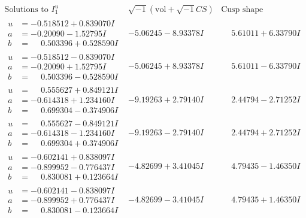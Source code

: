 \documentclass[1p]{elsarticle_modified}
\theoremstyle{definition}
\newcommand{\I}{\sqrt{-1}}
\begin{document}
$$\begin{array}{c|c|c}  
\text{Solutions to }I^u_{1}& \I (\text{vol} + \sqrt{-1}CS) & \text{Cusp shape}\\
 \hline 
\begin{aligned}
u &= -0.518512 + 0.839070 I \\
a &= -0.20090 - 1.52795 I \\
b &= \phantom{-}0.503396 + 0.528590 I\end{aligned}
 & -5.06245 - 8.93378 I & \phantom{-}5.61011 + 6.33790 I \\ \hline\begin{aligned}
u &= -0.518512 - 0.839070 I \\
a &= -0.20090 + 1.52795 I \\
b &= \phantom{-}0.503396 - 0.528590 I\end{aligned}
 & -5.06245 + 8.93378 I & \phantom{-}5.61011 - 6.33790 I \\ \hline\begin{aligned}
u &= \phantom{-}0.555627 + 0.849121 I \\
a &= -0.614318 + 1.234160 I \\
b &= \phantom{-}0.699304 - 0.374906 I\end{aligned}
 & -9.19263 + 2.79140 I & \phantom{-}2.44794 - 2.71252 I \\ \hline\begin{aligned}
u &= \phantom{-}0.555627 - 0.849121 I \\
a &= -0.614318 - 1.234160 I \\
b &= \phantom{-}0.699304 + 0.374906 I\end{aligned}
 & -9.19263 - 2.79140 I & \phantom{-}2.44794 + 2.71252 I \\ \hline\begin{aligned}
u &= -0.602141 + 0.838097 I \\
a &= -0.899952 - 0.776437 I \\
b &= \phantom{-}0.830081 + 0.123664 I\end{aligned}
 & -4.82699 + 3.41045 I & \phantom{-}4.79435 - 1.46350 I \\ \hline\begin{aligned}
u &= -0.602141 - 0.838097 I \\
a &= -0.899952 + 0.776437 I \\
b &= \phantom{-}0.830081 - 0.123664 I\end{aligned}
 & -4.82699 - 3.41045 I & \phantom{-}4.79435 + 1.46350 I \\ \hline\begin{aligned}

\end{aligned}
\end{array}$$
\end{document}
